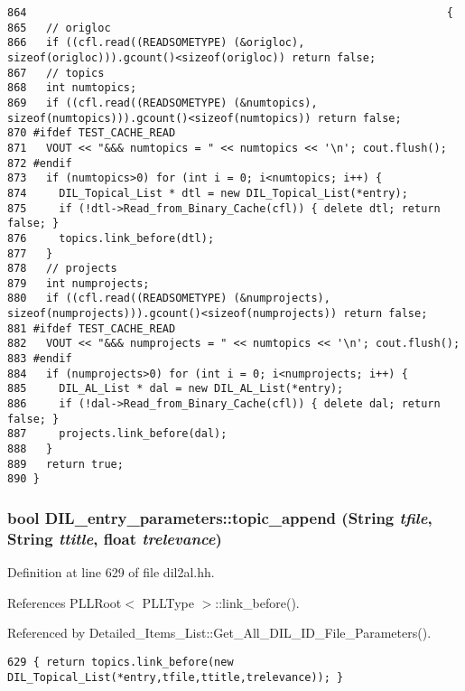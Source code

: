 \footnotesize\begin{verbatim}864                                                                 {
865   // origloc
866   if ((cfl.read((READSOMETYPE) (&origloc), sizeof(origloc))).gcount()<sizeof(origloc)) return false;
867   // topics
868   int numtopics;
869   if ((cfl.read((READSOMETYPE) (&numtopics), sizeof(numtopics))).gcount()<sizeof(numtopics)) return false;
870 #ifdef TEST_CACHE_READ
871   VOUT << "&&& numtopics = " << numtopics << '\n'; cout.flush();
872 #endif
873   if (numtopics>0) for (int i = 0; i<numtopics; i++) {
874     DIL_Topical_List * dtl = new DIL_Topical_List(*entry);
875     if (!dtl->Read_from_Binary_Cache(cfl)) { delete dtl; return false; }
876     topics.link_before(dtl);
877   }
878   // projects
879   int numprojects;
880   if ((cfl.read((READSOMETYPE) (&numprojects), sizeof(numprojects))).gcount()<sizeof(numprojects)) return false;
881 #ifdef TEST_CACHE_READ
882   VOUT << "&&& numprojects = " << numtopics << '\n'; cout.flush();
883 #endif
884   if (numprojects>0) for (int i = 0; i<numprojects; i++) {
885     DIL_AL_List * dal = new DIL_AL_List(*entry);
886     if (!dal->Read_from_Binary_Cache(cfl)) { delete dal; return false; }
887     projects.link_before(dal);
888   }
889   return true;
890 }
\end{verbatim}\normalsize 
{}
\subsubsection{\setlength{\rightskip}{0pt plus 5cm}bool DIL\_\-entry\_\-parameters::topic\_\-append ({\bf String} {\em tfile}, {\bf String} {\em ttitle}, float {\em trelevance})\hspace{0.3cm}{\tt  [inline]}}\label{classDIL__entry__parameters_a1}




Definition at line 629 of file dil2al.hh.

References PLLRoot$<$ PLLType $>$::link\_\-before().

Referenced by Detailed\_\-Items\_\-List::Get\_\-All\_\-DIL\_\-ID\_\-File\_\-Parameters().



\footnotesize\begin{verbatim}629 { return topics.link_before(new DIL_Topical_List(*entry,tfile,ttitle,trelevance)); }
\end{verbatim}\normalsize 
{}

